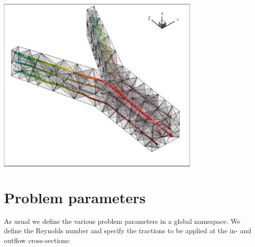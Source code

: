 
\begin{DoxyImage}
\includegraphics[width=0.75\textwidth]{flow_with_stream_ribbons}
\end{DoxyImage}




 

\hypertarget{index_namespace}{}\section{Problem parameters}\label{index_namespace}
As usual we define the various problem parameters in a global namespace. We define the Reynolds number and specify the tractions to be applied at the in-\/ and outflow cross-\/sections\+:

